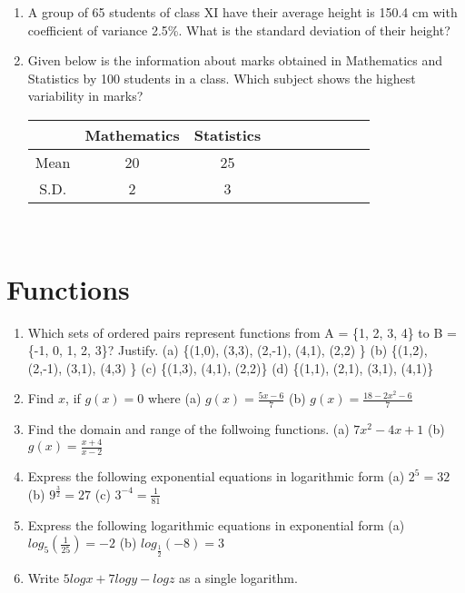 \documentclass[14pt]{article}
\begin{document}
\begin{multicols}{2}
\begin{enumerate}[resume]
\item A group of 65 students of class XI have their average height is 150.4 cm with coefficient of variance 2.5\%. What is the standard deviation of their height?

\item Given below is the information about marks obtained in Mathematics and Statistics by 100 students in a class. Which subject shows
the highest variability in marks?
\begin{tabular}{|c|*{9}{c|}}
\hline  & Mathematics & Statistics \\
\hline Mean & 20 & 25  \\
\hline S.D. & 2 & 3  \\
\hline
\end{tabular}\\

\end{enumerate} 

\section{Functions}
\noindent
\begin{enumerate}[resume]


 \item  Which sets of ordered pairs represent
functions from A = \{1, 2, 3, 4\} to B = \{-1, 0,
1, 2, 3\}? Justify. 
	 (a)	 \{(1,0), (3,3), (2,-1), (4,1), (2,2) \}    
	 (b) 	\{(1,2), (2,-1), (3,1), (4,3) \}   	 (c) 	\{(1,3), (4,1), (2,2)\}	 (d) 	\{(1,1), (2,1), (3,1), (4,1)\}
 
 \item Find $x$, if $g (x) = 0$ where  (a) $g(x)=\frac{5x-6}{7}$ (b) $g(x)=\frac{18-2x^2-6}{7}$ 
 
 \item Find the domain and range of the follwoing
functions. (a) $7x^2-4x+1$ (b) $g (x) = \frac{x+4}{x-2}$

\item Express the following exponential equations
in logarithmic form  (a) $2^5=32$ (b) $9^\frac{3}{2}=27$ (c) $3^{-4} = \frac{1}{81}$

\item Express the following logarithmic equations 	
in exponential form (a) $log_5\left( \frac{1}{25}\right)=-2$ (b) $log_\frac{1}{2}(-8)=3$ 

\item Write $5log x + 7log y - log z$ as a single
logarithm.


\end{enumerate}
\end{multicols}
\end{document}
